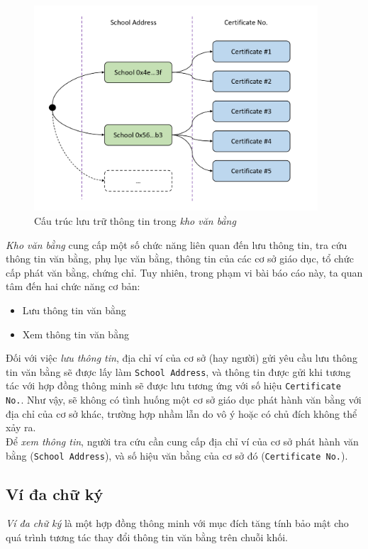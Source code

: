 \begin{figure}[!ht]
    \centering
    \includegraphics[width=400px]{anh/giai-phap/certs-tree.png}
    \caption{Cấu trúc lưu trữ thông tin trong \textit{kho văn bằng}}
\end{figure}

\textit{Kho văn bằng} cung cấp một số chức năng liên quan đến lưu thông tin, tra cứu thông tin văn bằng, phụ lục văn bằng, thông tin của các cơ sở giáo dục, tổ chức cấp phát văn bằng, chứng chỉ. Tuy nhiên, trong phạm vi bài báo cáo này, ta quan tâm đến hai chức năng cơ bản:
\begin{itemize}
    \item Lưu thông tin văn bằng
    \item Xem thông tin văn bằng
\end{itemize}

Đối với việc \textit{lưu thông tin}, địa chỉ ví của cơ sở (hay người) gửi yêu cầu lưu thông tin văn bằng sẽ được lấy làm \texttt{School Address}, và thông tin được gửi khi tương tác với hợp đồng thông minh sẽ được lưu tương ứng với số hiệu \texttt{Certificate No.}. Như vậy, sẽ không có tình huống một cơ sở giáo dục phát hành văn bằng với địa chỉ của cơ sở khác, trường hợp nhầm lẫn do vô ý hoặc có chủ đích không thể xảy ra.\\

Để \textit{xem thông tin}, người tra cứu cần cung cấp địa chỉ ví của cơ sở phát hành văn bằng (\texttt{School Address}), và số hiệu văn bằng của cơ sở đó (\texttt{Certificate No.}).


\subsection{Ví đa chữ ký}
\textit{Ví đa chữ ký} là một hợp đồng thông minh với mục đích tăng tính bảo mật cho quá trình tương tác thay đổi thông tin văn bằng trên chuỗi khối.\\

